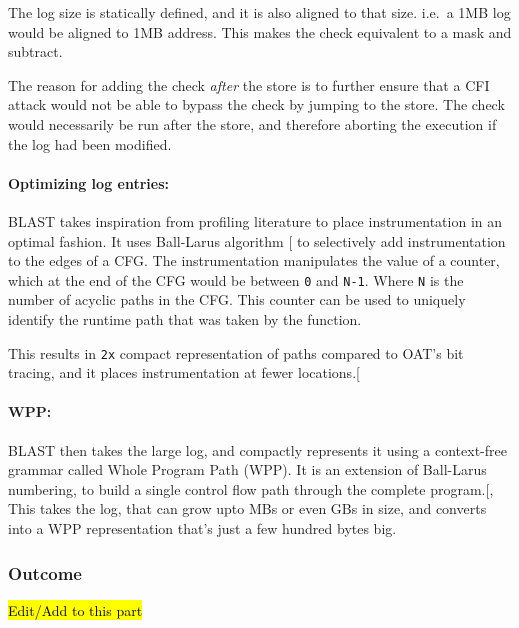 \documentclass[a4paper, nobind]{templates/ociamthesis}
\begin{document}
The log size is statically defined, and it is also aligned to that size.
i.e.~a 1MB log would be aligned to 1MB address. This makes the check equivalent
to a mask and subtract.

The reason for adding the check \emph{after} the store is to further ensure that a
CFI attack would not be able to bypass the check by jumping to the store.
The check would necessarily be run after the store, and therefore aborting the
execution if the log had been modified.

\paragraph{Optimizing log entries:}\label{optimizing-log-entries}

BLAST takes inspiration from profiling literature to place instrumentation in
an optimal fashion. It uses Ball-Larus algorithm {[}\citeproc{ref-balllarus}{11}{]} to selectively
add instrumentation to the edges of a CFG. The instrumentation manipulates the value of a counter,
which at the end of the CFG would be between \texttt{0} and \texttt{N-1}. Where \texttt{N} is the number
of acyclic paths in the CFG. This counter can be used to uniquely identify the
runtime path that was taken by the function.

This results in \texttt{2x} compact representation of paths compared to OAT's bit tracing,
and it places instrumentation at fewer locations.{[}\citeproc{ref-blast}{26}{]}

\paragraph{WPP:}\label{wpp}

BLAST then takes the large log, and compactly represents it using a context-free
grammar called Whole Program Path (WPP). It is an extension of Ball-Larus numbering, to build a single
control flow path through the complete program.{[}, \citeproc{ref-blast}{26}{]}
This takes the log, that can grow upto MBs or even GBs in size, and converts into
a WPP representation that's just a few hundred bytes big.

\subsubsection{Outcome}\label{outcome}

\hl{Edit/Add to this part}
\end{document}
